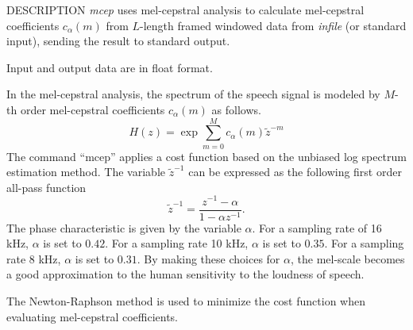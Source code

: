 \begin{synopsis}
\item [mcep] [ --a $A$ ] [ --m $M$ ] [ --l $L$ ] [ --q $Q$ ] [ --i $I$ ] [ --j $J$ ] 
	     [ --d $D$ ] [ --e $e$ ] [ --E $E$ ] [ --f $F$ ]
\item [\ ~~~~~~~~] [ {\em infile} ]
\end{synopsis}

\begin{qsection}{DESCRIPTION}
{\em mcep} uses mel-cepstral analysis 
to calculate mel-cepstral coefficients $c_{\alpha}(m)$ 
from $L$-length framed windowed data from {\em infile} (or standard input), 
sending the result to standard output.

Input and output data are in float format.

In the mel-cepstral analysis, the spectrum of the speech signal
is modeled by $M$-th order mel-cepstral coefficients $c_{\alpha}(m)$
as follows.
\begin{displaymath}
H(z) = \exp \sum_{m=0}^M c_{\alpha}(m) \tilde{z}^{-m} 
\end{displaymath}
The command ``mcep'' applies a cost function based on
 the unbiased log spectrum estimation method.
The variable $\tilde{z}^{-1}$ can be expressed as the following
first order all-pass function
\begin{displaymath}
\tilde{z}^{-1} = \frac{z^{-1}-\alpha}{1-\alpha z^{-1}}.
\end{displaymath}
The phase characteristic is given by the variable $\alpha$.
For a sampling rate of 16 kHz, $\alpha$ is set to $0.42$.
For a sampling rate 10 kHz, $\alpha$ is set to $0.35$.
For a sampling rate 8 kHz, $\alpha$ is set to $0.31$.
By making these choices for $\alpha$,
the mel-scale becomes a good approximation to the human
sensitivity to the loudness of speech.

The Newton-Raphson method is used to minimize the cost function
when evaluating mel-cepstral coefficients.
\end{qsection}

